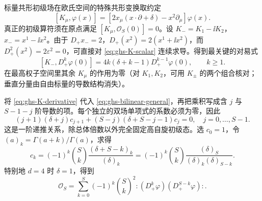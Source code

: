 \begin{proposition}[初级条件与导数分配系数]
标量共形初级场在欧氏空间的特殊共形变换取约定
\begin{equation}\label{eq:ghs-K-scalar}
 [K_\mu,\varphi(x)]=
 [2x_\mu(x\cdot\partial+\delta)-x^2\partial_\mu]\varphi(x).
\end{equation}
真正的初级算符须在原点满足 $[K_\mu,\mathcal O_S(0)]=0$。设 $K_-=K_1-\ii K_2$，$x_-=x^1-\ii x^2$。由于 $D_+x_-=2$，$D_+(x^2)=2(x^1+\ii x^2)$，而 $D_+^2(x^2)=2\varepsilon^2=0$，可直接对 \cref{eq:ghs-K-scalar} 连续求导。得到最关键的对易式
\begin{equation}\label{eq:ghs-K-derivative}
 [K_-,D_+^k\varphi(0)]=4k(\delta+k-1)D_+^{k-1}\varphi(0),\qquad k\ge1.
\end{equation}
在最高权子空间里其余 $K_\mu$ 的作用为零（对 $K_1,K_2$，可用 $K_\pm$ 的两个组合核对；垂直分量由自由标量的导数结构消失）。

将 \cref{eq:ghs-K-derivative} 代入 \cref{eq:ghs-bilinear-general}，再把乘积写成含 $j$ 与 $S-1-j$ 阶导数的项。每个独立的双场单项式的系数必须为零，因此
\begin{equation}\label{eq:ghs-primary-recurrence}
 (j+1)(\delta+j)c_{j+1}
 +(S-j)(\delta+S-j-1)c_j=0,
 \quad j=0,\ldots,S-1.
\end{equation}
这是一阶递推关系，除总体倍数以外完全固定高自旋初级态。选 $c_0=1$，令 $(a)_k=\Gamma(a+k)/\Gamma(a)$，求得
\begin{equation}\label{eq:ghs-primary-coefficients}
 c_k=(-1)^k\binom Sk\frac{(\delta+S-k)_k}{(\delta)_k}
 =(-1)^k\binom Sk\frac{(\delta)_S}{(\delta)_k(\delta)_{S-k}}.
\end{equation}
特别地 $d=4$ 时 $\delta=1$，得到
\begin{equation}\label{eq:ghs-four-d-current}
 \mathcal O_S=\sum_{k=0}^S(-1)^k\binom Sk^2
 :(D_+^k\varphi)(D_+^{S-k}\varphi):.
\end{equation}
\end{proposition}


